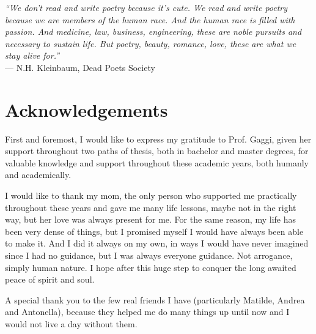 \cleardoublepage
{}
{}

\begin{flushright}{
    \slshape
    ``We don't read and write poetry because it's cute. We read and write poetry because we are members of the human race. And the human race is filled with passion. And medicine, law, business, engineering, these are noble pursuits and necessary to sustain life. But poetry, beauty, romance, love, these are what we stay alive for.''} \\
    \medskip
    --- N.H. Kleinbaum, Dead Poets Society
\end{flushright}

\begingroup
\let\clearpage\relax
\let\cleardoublepage\relax
\let\cleardoublepage\relax

\chapter*{Acknowledgements}

\noindent First and foremost, I would like to express my gratitude to Prof. Gaggi, given her support throughout two paths of thesis, both in bachelor and master degrees, for valuable knowledge and support throughout these academic years, both humanly and academically. 

\vspace{0.35cm}

\noindent I would like to thank my mom, the only person who supported me practically throughout these years and gave me many life lessons, maybe not in the right way, but her love was always present for me. For the same reason, my life has been very dense of things, but I promised myself I would have always been able to make it. And I did it always on my own, in ways I would have never imagined since I had no guidance, but I was always everyone guidance. Not arrogance, simply human nature. I hope after this huge step to conquer the long awaited peace of spirit and soul. 

\vspace{0.35cm}

\noindent A special thank you to the few real friends I have (particularly Matilde, Andrea and Antonella), because they helped me do many things up until now and I would not live a day without them.

\vspace{0.75cm}

\noindent{\myLocation, \myTime}
\hfill \textit{\myName}

\endgroup

